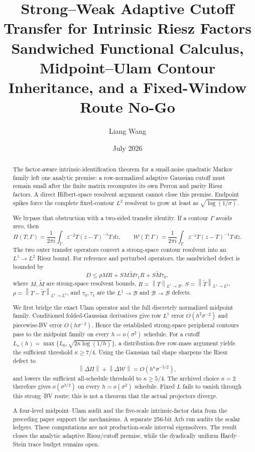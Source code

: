 \documentclass[11pt]{article}
\title{Strong--Weak Adaptive Cutoff Transfer for Intrinsic Riesz Factors\\
\large Sandwiched Functional Calculus, Midpoint--Ulam Contour Inheritance,
and a Fixed-Window Route No-Go}
\author{Liang Wang}
\date{July 2026}
\theoremstyle{remark}
\newcommand{\cB}{\mathcal B}
\newcommand{\cW}{\mathcal W}
\newcommand{\norm}[1]{\left\lVert #1\right\rVert}
\begin{document}
\maketitle

\begin{abstract}
The factor-aware intrinsic-identification theorem for a small-noise quadratic
Markov family left one analytic premise: a row-normalized adaptive Gaussian
cutoff must remain small after the finite matrix recomputes its own Perron
and parity Riesz factors.  A direct Hilbert-space resolvent argument cannot
close this premise.  Endpoint spikes force the complete fixed-contour
$L^2$ resolvent to grow at least as
$\sqrt{\log(1/\sigma)}$.

We bypass that obstruction with a two-sided transfer identity.  If a contour
$\Gamma$ avoids zero, then
\[
 \Pi(T;\Gamma)=\frac1{2\pi i}\int_\Gamma
 z^{-2}T(z-T)^{-1}T\,dz,
 \qquad
 \cW(T;\Gamma)=\frac1{2\pi i}\int_\Gamma
 z^{-1}T(z-T)^{-1}T\,dz.
\]
The two outer transfer operators convert a strong-space contour resolvent
into an $L^1\to L^2$ Riesz bound.  For reference and perturbed operators,
the sandwiched defect is bounded by
\[
 D\le \rho MR+SM\widetilde M\tau_1R+S\widetilde M\tau_0,
\]
where $M,\widetilde M$ are strong-space resolvent bounds,
$R=\norm T_{L^1\to\cB}$, $S=\norm{\widetilde T}_{L^1\to L^2}$,
$\rho=\norm{T-\widetilde T}_{L^1\to L^2}$, and
$\tau_0,\tau_1$ are the $L^1\to\cB$ and $\cB\to\cB$ defects.

We first bridge the exact Ulam operator and the full discretely normalized
midpoint family.  Conditioned folded-Gaussian derivatives give row
$L^1$ error $O(h^2\sigma^{-2})$ and piecewise-BV error
$O(h\sigma^{-2})$.  Hence the established strong-space peripheral contours
pass to the midpoint family on every $h=o(\sigma^2)$ schedule.  For a cutoff
$L_\kappa(h)=\max\{L_0,\sqrt{2\kappa\log(1/h)}\}$, a distribution-free
row-mass argument yields the sufficient threshold $\kappa\ge7/4$.
Using the Gaussian tail shape sharpens the Riesz defect to
\[
 \norm{\Delta\Pi}+\norm{\Delta\cW}
 =O(h^\kappa\sigma^{-5/2}),
\]
and lowers the sufficient all-schedule threshold to $\kappa\ge5/4$.
The archived choice $\kappa=2$ therefore gives $o(\sigma^{3/2})$ on every
$h=o(\sigma^2)$ schedule.  Fixed $L$ fails to vanish through this
strong--BV route; this is not a theorem that the actual projectors diverge.

A four-level midpoint--Ulam audit and the five-scale intrinsic-factor data
from the preceding paper support the mechanisms.  A separate 256-bit Arb
run audits the scalar ledgers.  These computations are not production-scale
interval eigensolvers.  The result closes the analytic adaptive
Riesz/cutoff premise, while the dyadically uniform Hardy--Stein trace budget
remains open.
\end{abstract}
\end{document}
